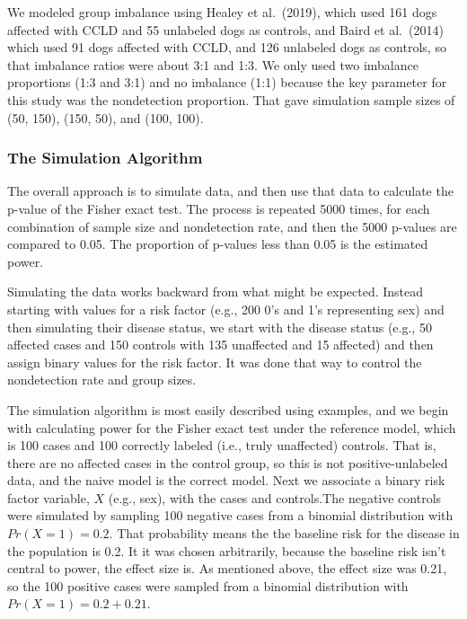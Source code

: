 \documentclass[
]{article}
\begin{document}
We modeled group imbalance using Healey et al.~(2019), which used 161
dogs affected with CCLD and 55 unlabeled dogs as controls, and Baird et
al.~(2014) which used 91 dogs affected with CCLD, and 126 unlabeled dogs
as controls, so that imbalance ratios were about 3:1 and 1:3.
\cite{bcioa14} \cite{hmhcbhkr19} We only used two imbalance proportions
(1:3 and 3:1) and no imbalance (1:1) because the key parameter for this
study was the nondetection proportion. That gave simulation sample sizes
of (50, 150), (150, 50), and (100, 100).

\pagebreak

\hypertarget{the-simulation-algorithm}{%
\subsubsection{The Simulation
Algorithm}\label{the-simulation-algorithm}}

The overall approach is to simulate data, and then use that data to
calculate the p-value of the Fisher exact test. The process is repeated
5000 times, for each combination of sample size and nondetection rate,
and then the 5000 p-values are compared to 0.05. The proportion of
p-values less than 0.05 is the estimated power.

Simulating the data works backward from what might be expected. Instead
starting with values for a risk factor (e.g., 200 0's and 1's
representing sex) and then simulating their disease status, we start
with the disease status (e.g., 50 affected cases and 150 controls with
135 unaffected and 15 affected) and then assign binary values for the
risk factor. It was done that way to control the nondetection rate and
group sizes.

The simulation algorithm is most easily described using examples, and we
begin with calculating power for the Fisher exact test under the
reference model, which is 100 cases and 100 correctly labeled (i.e.,
truly unaffected) controls. That is, there are no affected cases in the
control group, so this is not positive-unlabeled data, and the naive
model is the correct model. Next we associate a binary risk factor
variable, \(X\) (e.g., sex), with the cases and controls.The negative
controls were simulated by sampling 100 negative cases from a binomial
distribution with \(Pr(X=1) = 0.2\). That probability means the the
baseline risk for the disease in the population is 0.2. It it was chosen
arbitrarily, because the baseline risk isn't central to power, the
effect size is. As mentioned above, the effect size was 0.21, so the 100
positive cases were sampled from a binomial distribution with
\(Pr(X=1) = 0.2 + 0.21\).
\end{document}
